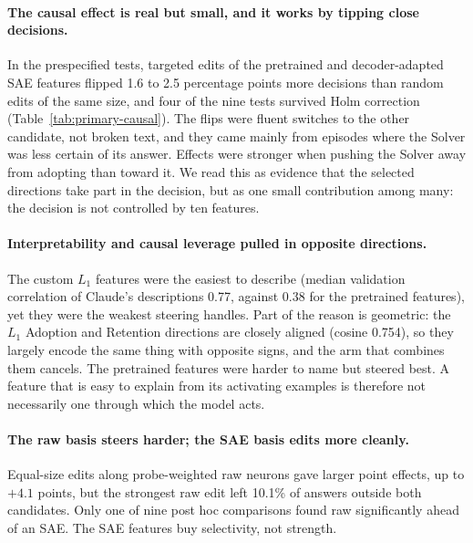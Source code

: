 \paragraph{The causal effect is real but small, and it works by tipping close
decisions.} In the prespecified tests, targeted edits of the pretrained and
decoder-adapted SAE features flipped 1.6 to 2.5 percentage points more
decisions than random edits of the same size, and four of the nine tests
survived Holm correction (Table~\ref{tab:primary-causal}). The flips were
fluent switches to the other candidate, not broken text, and they came mainly
from episodes where the Solver was less certain of its answer. Effects were
stronger when pushing the Solver away from adopting than toward it. We read
this as evidence that the selected directions take part in the decision, but
as one small contribution among many: the decision is not controlled by ten
features.

\paragraph{Interpretability and causal leverage pulled in opposite
directions.} The custom $L_1$ features were the easiest to describe (median
validation correlation of Claude's descriptions 0.77, against 0.38 for the
pretrained features), yet they were the weakest steering handles. Part of the
reason is geometric: the $L_1$ Adoption and Retention directions are closely
aligned (cosine 0.754), so they largely encode the same thing with opposite
signs, and the arm that combines them cancels. The pretrained features were
harder to name but steered best. A feature that is easy to explain from its
activating examples is therefore not necessarily one through which the model
acts.

\paragraph{The raw basis steers harder; the SAE basis edits more cleanly.}
Equal-size edits along probe-weighted raw neurons gave larger point effects,
up to $+4.1$ points, but the strongest raw edit left 10.1\% of answers outside
both candidates. Only one of nine post hoc comparisons found raw significantly
ahead of an SAE. The SAE features buy selectivity, not strength.

